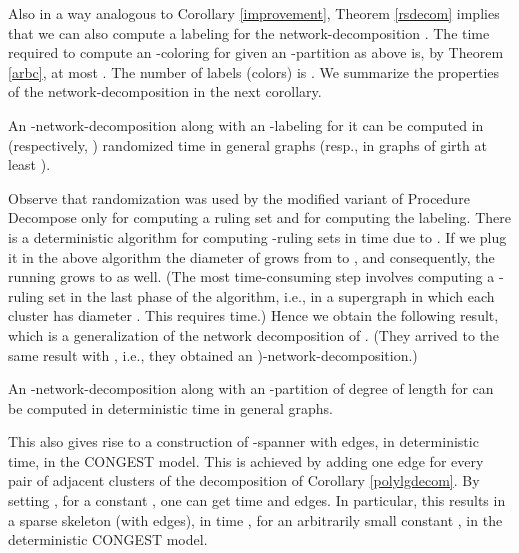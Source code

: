 \documentclass[11pt]{article}
\begin{document}
Also in a way analogous to Corollary \ref{improvement}, Theorem \ref{rsdecom} implies that we can also compute a labeling for the network-decomposition . The time required to compute an -coloring for  given an -partition as above is, by Theorem \ref{arbc}, at most . The number of labels (colors) is . We summarize the properties of the network-decomposition  in the next corollary.
\begin{col}
An -network-decomposition  along with an -labeling for it can be computed in  (respectively,  ) randomized time in general graphs (resp., in graphs of girth at least ).
\end{col}
Observe that randomization was used by the modified variant of Procedure Decompose only for computing a ruling set and for computing the labeling. There is a deterministic algorithm for computing -ruling sets in  time due to \cite{AGLP89}. If we plug it in the above algorithm the diameter of  grows from  to , and consequently, the running grows to  as well. (The most time-consuming step involves computing a -ruling set in the last phase of the algorithm, i.e., in a supergraph in which each cluster has diameter . This requires  time.)
Hence we obtain the following result, which is a generalization of the network decomposition of \cite{AGLP89}. (They arrived to the same result with , i.e., they obtained an )-network-decomposition.)
\begin{col} \label{polylgdecom}
An -network-decomposition  along with  an -partition  of degree  of length  for  can be computed in deterministic  time in general graphs.
\end{col}
This also gives rise to a construction of -spanner with  edges, in deterministic  time, in the CONGEST model. This is achieved by adding one edge for every pair of adjacent clusters of the decomposition of Corollary \ref{polylgdecom}. By setting , for a constant , one can get  time and  edges. In particular, this results in a sparse skeleton (with  edges), in time , for an arbitrarily small constant , in the deterministic CONGEST model.
\end{document}
